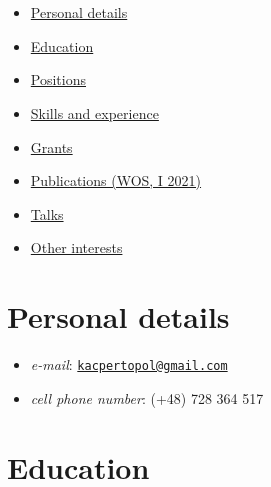 \hypertarget{section}{%
\section{}\label{section}}

\begin{itemize}
\tightlist
\item
  \protect\hyperlink{personal-details}{Personal details}
\item
  \protect\hyperlink{education}{Education}
\item
  \protect\hyperlink{positions}{Positions}
\item
  \protect\hyperlink{skills-and-experience}{Skills and experience}
\item
  \protect\hyperlink{grants}{Grants}
\item
  \href{./0pl.html}{Publications (WOS, I 2021)}
\item
  \href{./00pl.html}{Talks}
\item
  \protect\hyperlink{other-interests}{Other interests}
\end{itemize}

\hypertarget{personal-details}{%
\section{Personal details}\label{personal-details}}

\begin{itemize}
\tightlist
\item
  \emph{e-mail}:
  \href{mailto:kacpertopol@gmail.com}{\nolinkurl{kacpertopol@gmail.com}}
\item
  \emph{cell phone number}: (+48) 728 364 517
\end{itemize}

\hypertarget{education}{%
\section{Education}\label{education}}

